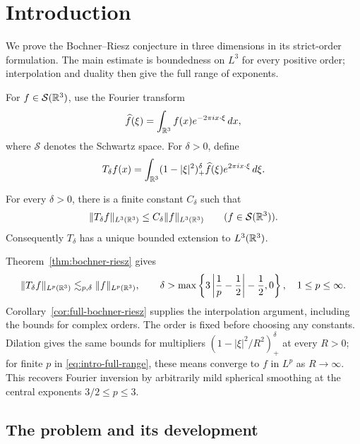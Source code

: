 \section{Introduction}
\label{sec:introduction}

We prove the Bochner--Riesz conjecture in three dimensions in its
strict-order formulation. The main estimate is boundedness on $L^3$
for every positive order; interpolation and duality then give the full
range of exponents.

For $f\in\mathcal S(\mathbb R^3)$, use the Fourier transform
\[
 \widehat f(\xi)=\int_{\mathbb R^3}f(x)e^{-2\pi i x\cdot\xi}\,dx,
\]
where $\mathcal S$ denotes the Schwartz space. For $\delta>0$, define
\begin{equation}
 T_\delta f(x)
 =\int_{\mathbb R^3}(1-\lvert\xi\rvert^2)_+^\delta
       \widehat f(\xi)e^{2\pi i x\cdot\xi}\,d\xi .
 \label{eq:main-multiplier}
\end{equation}

\begin{theorem}
\label{thm:bochner-riesz}
For every $\delta>0$, there is a finite constant $C_\delta$ such that
\begin{equation}
 \lVert T_\delta f\rVert_{L^3(\mathbb R^3)}
 \le C_\delta\lVert f\rVert_{L^3(\mathbb R^3)}
 \qquad(f\in\mathcal S(\mathbb R^3)).
 \label{eq:main-bound}
\end{equation}
Consequently $T_\delta$ has a unique bounded extension to $L^3(\mathbb R^3)$.
\end{theorem}

Theorem~\ref{thm:bochner-riesz} gives
\begin{equation}
 \lVert T_\delta f\rVert_{L^p(\mathbb R^3)}
 \lesssim_{p,\delta}\lVert f\rVert_{L^p(\mathbb R^3)},\qquad
 \delta>\max\left\{3\left|\frac1p-\frac12\right|-\frac12,0\right\},
 \quad 1\le p\le\infty .
 \label{eq:intro-full-range}
\end{equation}
Corollary~\ref{cor:full-bochner-riesz} supplies the interpolation
argument, including the bounds for complex orders. The order is fixed
before choosing any constants. Dilation gives the same bounds for
multipliers $(1-|\xi|^2/R^2)_+^\delta$ at every $R>0$; for finite $p$
in \eqref{eq:intro-full-range}, these means converge to $f$ in $L^p$
as $R\to\infty$. This recovers Fourier inversion by arbitrarily mild
spherical smoothing at the central exponents $3/2\le p\le3$.

\subsection{The problem and its development}

